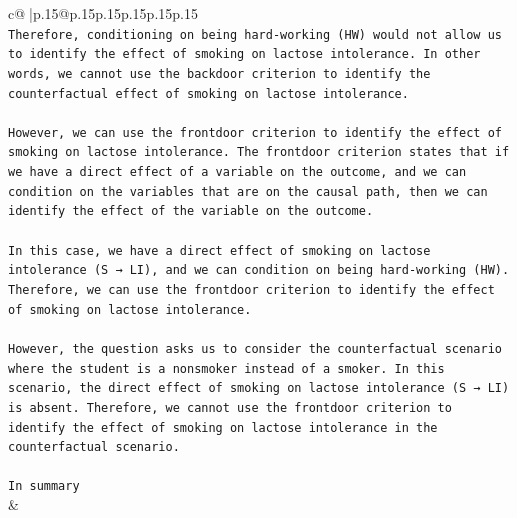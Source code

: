 \documentclass{article}
\begin{document}
{\begin{supertabular}{c@{$\;$}|p{.15\linewidth}@{}p{.15\linewidth}p{.15\linewidth}p{.15\linewidth}p{.15\linewidth}p{.15\linewidth}}
{{{\\ 
\texttt{Therefore, conditioning on being hard{-}working (HW) would not allow us to identify the effect of smoking on lactose intolerance. In other words, we cannot use the backdoor criterion to identify the counterfactual effect of smoking on lactose intolerance.} \\
\\ 
\texttt{However, we can use the frontdoor criterion to identify the effect of smoking on lactose intolerance. The frontdoor criterion states that if we have a direct effect of a variable on the outcome, and we can condition on the variables that are on the causal path, then we can identify the effect of the variable on the outcome.} \\
\\ 
\texttt{In this case, we have a direct effect of smoking on lactose intolerance (S → LI), and we can condition on being hard{-}working (HW). Therefore, we can use the frontdoor criterion to identify the effect of smoking on lactose intolerance.} \\
\\ 
\texttt{However, the question asks us to consider the counterfactual scenario where the student is a nonsmoker instead of a smoker. In this scenario, the direct effect of smoking on lactose intolerance (S → LI) is absent. Therefore, we cannot use the frontdoor criterion to identify the effect of smoking on lactose intolerance in the counterfactual scenario.} \\
\\ 
\texttt{In summary} \\
            }
        }
    }
    & \\ \\


\end{supertabular}}
\end{document}
